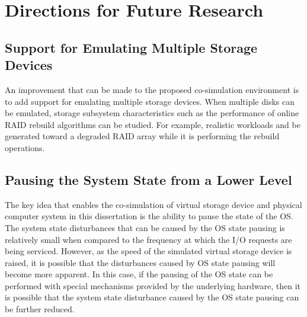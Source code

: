 \section{Directions for Future Research}

\subsection{Support for Emulating Multiple Storage Devices}

An improvement that can be made to the proposed co-simulation environment is to add support for emulating multiple storage devices. When multiple disks can be emulated, storage subsystem characteristics such as the performance of online RAID rebuild algorithms can be studied. For example, realistic workloads and be generated toward a degraded RAID array while it is performing the rebuild operations.

\subsection{Pausing the System State from a Lower Level}

The key idea that enables the co-simulation of virtual storage device and physical computer system in this dissertation is the ability to pause the state of the OS. The system state disturbances that can be caused by the OS state pausing is relatively small when compared to the frequency at which the I/O requests are being serviced. However, as the speed of the simulated virtual storage device is raised, it is possible that the disturbances caused by OS state pausing will become more apparent. In this case, if the pausing of the OS state can be performed with special mechanisms provided by the underlying hardware, then it is possible that the system state disturbance caused by the OS state pausing can be further reduced.


